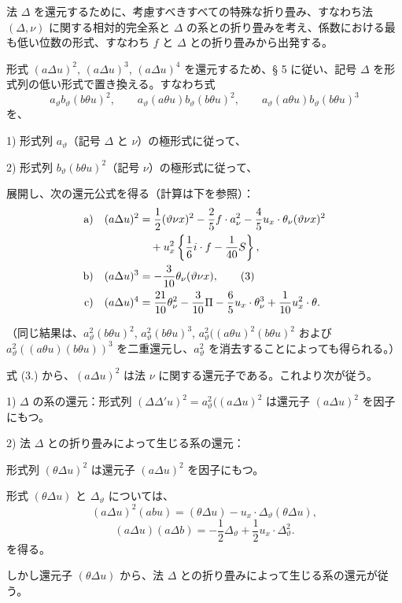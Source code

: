 \documentclass[11pt]{article}
\newcommand{\A}{\Delta}
\begin{document}
法 $\A$ を還元するために、考慮すべきすべての特殊な折り畳み、すなわち法 $(\A,\nu)$ に関する相対的完全系と $\A$ の系との折り畳みを考え、係数における最も低い位数の形式、すなわち $f$ と $\A$ との折り畳みから出発する。

形式 $(a\A u)^2$, $(a\A u)^3$, $(a\A u)^4$ を還元するため、§ 5 に従い、記号 $\A$ を形式列の低い形式で置き換える。すなわち式
\[
a_\vartheta b_\vartheta(b\theta u)^2,\qquad
a_\vartheta(a\theta u)b_\vartheta(b\theta u)^2,\qquad
a_\vartheta(a\theta u)b_\vartheta(b\theta u)^3
\]
を、

1) 形式列 $a_\vartheta$（記号 $\A$ と $\nu$）の極形式に従って、

2) 形式列 $b_\vartheta(b\theta u)^2$（記号 $\nu$）の極形式に従って、

展開し、次の還元公式を得る（計算は下を参照）：
\begin{align}
\text{a)}\quad (a\A u)^2
&=\frac12(\vartheta\nu x)^2-\frac25 f\cdot a_\nu^2
-\frac45u_x\cdot\theta_\nu(\vartheta\nu x)^2 \notag\\
&\quad+u_x^2\left\{\frac16 i\cdot f-\frac1{40}S\right\},\notag\\
\text{b)}\quad (a\A u)^3
&=-\frac3{10}\theta_\nu(\vartheta\nu x),\tag{3}\\
\text{c)}\quad (a\A u)^4
&=\frac{21}{10}\theta_\nu^2-\frac3{10}\Pi
-\frac65u_x\cdot\theta_\nu^3+\frac1{10}u_x^2\cdot\theta .\notag
\end{align}

（同じ結果は、$a_\vartheta^2(b\theta u)^2$, $a_\vartheta^2(b\theta u)^3$, $a_\vartheta^2((a\theta u)^2(b\theta u)^2$ および $a_\vartheta^2((a\theta u)(b\theta u))^3$ を二重還元し、$a_\vartheta^2$ を消去することによっても得られる。）

式 (3.) から、$(a\A u)^2$ は法 $\nu$ に関する還元子である。これより次が従う。

1) $\A$ の系の還元：形式列 $(\A\A' u)^2=a_\vartheta^2((a\A u)^2$ は還元子 $(a\A u)^2$ を因子にもつ。

2) 法 $\A$ との折り畳みによって生じる系の還元：

形式列 $(\theta\A u)^2$ は還元子 $(a\A u)^2$ を因子にもつ。

形式 $(\theta\A u)$ と $\A_\vartheta$ については、
\[
(a\A u)^2(abu)=(\theta\A u)-u_x\cdot\A_\vartheta(\theta\A u),
\]
\[
(a\A u)(a\A b)=-\frac12\A_\vartheta+\frac12u_x\cdot\A_\vartheta^2.
\]
を得る。

しかし還元子 $(\theta\A u)$ から、法 $\A$ との折り畳みによって生じる系の還元が従う。

\bigskip
\end{document}
